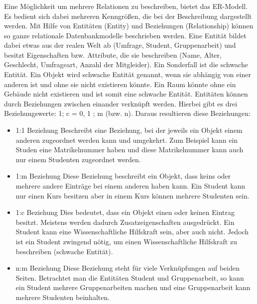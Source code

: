 \subsubsection{}
Eine Möglichkeit um mehrere Relationen zu beschreiben, bietet das \acf{ER-Modell}. 
Es bedient sich dabei mehreren Kenngrößen, die bei der Beschreibung dargestellt werden. 
Mit Hilfe von Entitäten (Entity) und Beziehungen (Relationship) können so ganze relationale Datenbankmodelle beschrieben werden.
Eine Entität bildet dabei etwas aus der realen Welt ab (Umfrage, Student, Gruppenarbeit) und besitzt Eigenschaften bzw. Attribute, die sie beschreiben (Name, Alter, Geschlecht, Umfrageart, Anzahl der Mitgleider).
Ein Sonderfall ist die schwache Entität. 
Ein Objekt wird schwache Entität genannt, wenn sie abhängig von einer anderen ist und ohne sie nicht existieren könnte. 
Ein Raum könnte ohne ein Gebäude nicht existieren und ist somit eine schwache Entität. 
Entitäten können durch Beziehungen zwischen einander verknüpft werden. 
Hierbei gibt es drei Beziehungswerte: 1; c = {0, 1} ; m (bzw. n). 
Daraus resultieren diese Beziehungen:

\begin{itemize}
    \item 1:1 Beziehung \newline
    Beschreibt eine Beziehung, bei der jeweils ein Objekt einem anderen zugeordnet werden kann und umgekehrt. 
    Zum Beispiel kann ein Studen eine Matrikelnummer haben und diese Matrikelnummer kann auch nur einem Studenten zugeordnet werden.
    \item 1:m Beziehung \newline
    Diese Beziehung beschreibt ein Objekt, dass keins oder mehrere andere Einträge bei einem anderen haben kann. 
    Ein Student kann nur einen Kurs besitzen aber in einem Kurs können mehrere Studenten sein. 
    \item 1:c Beziehung \newline
    Dies bedeutet, dass ein Objekt einen oder keinen Eintrag besitzt. 
    Meistens werden dadurch Zusatzeigenschaften ausgedrückt. 
    Ein Student kann eine Wissenschaftliche Hilfskraft sein, aber auch nicht. 
    Jedoch ist ein Student zwingend nötig, um einen Wissenschaftliche Hilfskraft zu beschreiben (schwache Entität).
    \item n:m Beziehung \newline
    Diese Beziehung steht für viele Verknüpfungen auf beiden Seiten. 
    Betrachtet man die Entitäten Student und Gruppenarbeit, so kann ein Student mehrere Gruppenarbeiten machen und eine Gruppenarbeit kann mehrere Studenten beinhalten.
\end{itemize}


